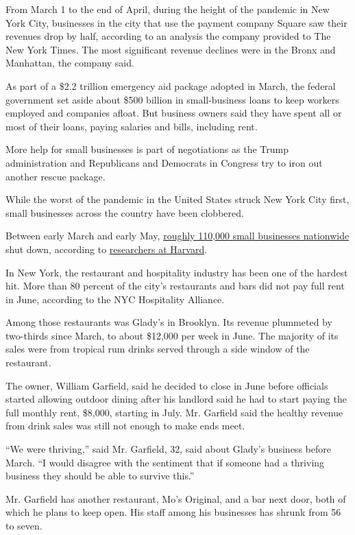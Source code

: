 From March 1 to the end of April, during the height of the pandemic in
New York City, businesses in the city that use the payment company
Square saw their revenues drop by half, according to an analysis the
company provided to The New York Times. The most significant revenue
declines were in the Bronx and Manhattan, the company said.

As part of a \$2.2 trillion emergency aid package adopted in March, the
federal government set aside about \$500 billion in small-business loans
to keep workers employed and companies afloat. But business owners said
they have spent all or most of their loans, paying salaries and bills,
including rent.

More help for small businesses is part of negotiations as the Trump
administration and Republicans and Democrats in Congress try to iron out
another rescue package.

While the worst of the pandemic in the United States struck New York
City first, small businesses across the country have been clobbered.

Between early March and early May,
\href{https://www.nytimes.com/2020/07/13/business/small-businesses-coronavirus.html}{roughly
110,000 small businesses nationwide} shut down, according to
\href{https://www.nber.org/papers/w26989.pdf}{researchers at Harvard}.

In New York, the restaurant and hospitality industry has been one of the
hardest hit. More than 80 percent of the city's restaurants and bars did
not pay full rent in June, according to the NYC Hospitality Alliance.

Among those restaurants was Glady's in Brooklyn. Its revenue plummeted
by two-thirds since March, to about \$12,000 per week in June. The
majority of its sales were from tropical rum drinks served through a
side window of the restaurant.

The owner, William Garfield, said he decided to close in June before
officials started allowing outdoor dining after his landlord said he had
to start paying the full monthly rent, \$8,000, starting in July. Mr.
Garfield said the healthy revenue from drink sales was still not enough
to make ends meet.

``We were thriving,'' said Mr. Garfield, 32, said about Glady's business
before March. ``I would disagree with the sentiment that if someone had
a thriving business they should be able to survive this.''

Mr. Garfield has another restaurant, Mo's Original, and a bar next door,
both of which he plans to keep open. His staff among his businesses has
shrunk from 56 to seven.

